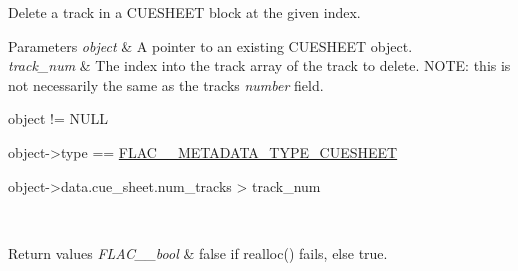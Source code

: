 Delete a track in a C\+U\+E\+S\+H\+E\+ET block at the given index.


\begin{DoxyParams}{Parameters}
{\em object} & A pointer to an existing C\+U\+E\+S\+H\+E\+ET object. \\
\hline
{\em track\+\_\+num} & The index into the track array of the track to delete. N\+O\+TE\+: this is not necessarily the same as the track\textquotesingle{}s {\itshape number} field.  
\begin{DoxyCode}
\textcolor{keywordtype}{object} != NULL 
\end{DoxyCode}
 
\begin{DoxyCode}
\textcolor{keywordtype}{object}->type == \hyperlink{group__flac__format_ggac71714ba8ddbbd66d26bb78a427fac01a0b3f07ae60609126562cd0233ce00a65}{FLAC\_\_METADATA\_TYPE\_CUESHEET} 
\end{DoxyCode}
 
\begin{DoxyCode}
\textcolor{keywordtype}{object}->data.cue\_sheet.num\_tracks > track\_num 
\end{DoxyCode}
 \\
\hline
\end{DoxyParams}

\begin{DoxyRetVals}{Return values}
{\em F\+L\+A\+C\+\_\+\+\_\+bool} & {\ttfamily false} if realloc() fails, else {\ttfamily true}. \\
\hline
\end{DoxyRetVals}
\mbox{\label{group__flac__metadata__object_ga87855591d933cd6371010a675f0bc629}} 
